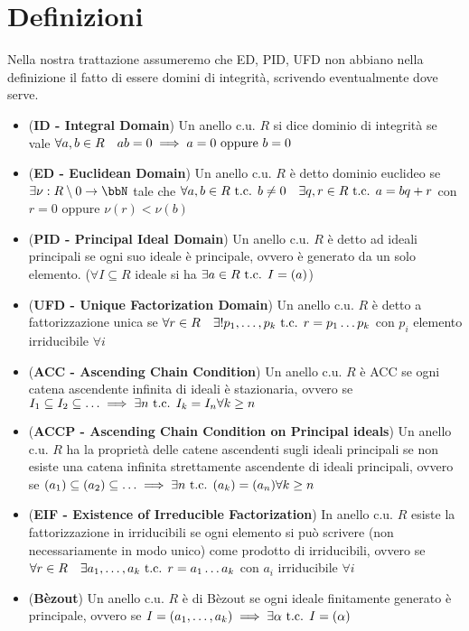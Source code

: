 \documentclass[a4paper,GeneralMath,NoNotes]{stdmdoc}
\begin{document}
	\section*{Definizioni}
	Nella nostra trattazione assumeremo che ED, PID, UFD non abbiano nella definizione il fatto di essere domini di integrità, scrivendo eventualmente dove serve.
	\begin{itemize}
		\item ({\bf ID - Integral Domain}) Un anello c.u. $R$ si dice dominio di integrità se vale $\forall a, b \in R \quad ab = 0 \implies a = 0 \text{ oppure } b = 0$
		\item ({\bf ED - Euclidean Domain}) Un anello c.u. $R$ è detto dominio euclideo se $\exists \nu : R \setminus {0} \rar \bbN$ tale che $\forall a, b \in R \mbox{ t.c. } b \neq 0 \quad \exists q, r \in R \mbox{ t.c. } a = bq + r$ con $r = 0$ oppure $\nu(r) < \nu(b)$
		\item ({\bf PID - Principal Ideal Domain}) Un anello c.u. $R$ è detto ad ideali principali se ogni suo ideale è principale, ovvero è generato da un solo elemento. ($\forall I \subseteq R$ ideale si ha $\exists a \in R \mbox{ t.c. } I = (a)$)
		\item ({\bf UFD - Unique Factorization Domain}) Un anello c.u. $R$ è detto a fattorizzazione unica se $\forall r \in R \quad \exists ! p_1, \ldots, p_k \mbox{ t.c. } r = p_1 \ldots p_k$ con $p_i$ elemento irriducibile $\forall i$
		\item ({\bf ACC - Ascending Chain Condition}) Un anello c.u. $R$ è ACC se ogni catena ascendente infinita di ideali è stazionaria, ovvero se $I_1 \subseteq I_2 \subseteq \ldots \implies \exists n \mbox{ t.c. } I_k = I_n \forall k \ge n$
		\item ({\bf ACCP - Ascending Chain Condition on Principal ideals}) Un anello c.u. $R$ ha la proprietà delle catene ascendenti sugli ideali principali se non esiste una catena infinita strettamente ascendente di ideali principali, ovvero se $(a_1) \subseteq (a_2) \subseteq \ldots \implies \exists n \mbox{ t.c. } (a_k) = (a_n) \forall k \ge n$
		\item ({\bf EIF - Existence of Irreducible Factorization}) In anello c.u. $R$ esiste la fattorizzazione in irriducibili se ogni elemento si può scrivere (non necessariamente in modo unico) come prodotto di irriducibili, ovvero se $\forall r \in R \quad \exists a_1, \ldots, a_k \mbox{ t.c. } r = a_1 \ldots a_k$ con $a_i$ irriducibile $\forall i$
		\item ({\bf Bèzout}) Un anello c.u. $R$ è di Bèzout se ogni ideale finitamente generato è principale, ovvero se $I = (a_1, \ldots, a_k) \implies \exists \alpha \mbox{ t.c. } I = (\alpha)$

\end{itemize}
\end{document}
